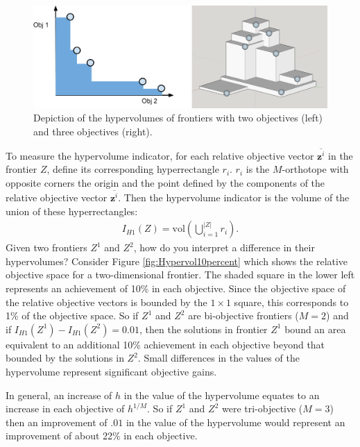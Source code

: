 \begin{figure}[ht]
\centering
\includegraphics[width=.85\textwidth]{../images/FrontierVolumesNo2DOutlines}
\caption[Hypervolume of Pareto frontiers]{Depiction of the hypervolumes of frontiers with two objectives (left) and three objectives (right).}
\label{fig:frontierVolumes}
\end{figure}

To measure the hypervolume indicator, for each relative objective vector $\overbar{\mathbf{z}^i}$ in the frontier $Z$, define its corresponding hyperrectangle $r_i$. $r_i$ is the $M$-orthotope with opposite corners the origin and the point defined by the components of the relative objective vector $\overbar{\mathbf{z}^i}$. Then the hypervolume indicator is the volume of the union of these hyperrectangles:
\begin{align}
I_{H1}(Z) = \text{vol} \left( \bigcup_{i = 1}^{|Z|} r_i \right). \label{eqn:hypervol}
\end{align}
Given two frontiers $Z^1$ and $Z^2$, how do you interpret a difference in their hypervolumes? Consider Figure \ref{fig:Hypervol10percent} which shows the relative objective space for a two-dimensional frontier. The shaded square in the lower left represents an achievement of 10\% in each objective. Since the objective space of the relative objective vectors is bounded by the $1 \times 1$ square, this corresponds to 1\% of the objective space. So if $Z^1$ and $Z^2$ are bi-objective frontiers ($M=2$) and if $I_{H1}(Z^1) - I_{H1}(Z^2) = 0.01$, then the solutions in frontier $Z^1$ bound an area equivalent to an additional 10\% achievement in each objective beyond that bounded by the solutions in $Z^2$. Small differences in the values of the hypervolume represent significant objective gains.

In general, an increase of $h$ in the value of the hypervolume equates to an increase in each objective of $h^{1/M}$. So if $Z^1$ and $Z^2$ were tri-objective ($M=3$) then an improvement of $.01$ in the value of the hypervolume would represent an improvement of about 22\% in each objective.

